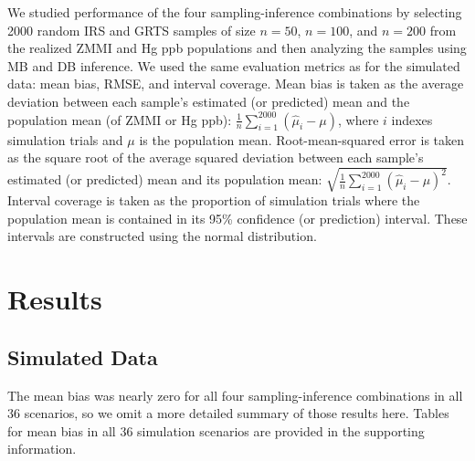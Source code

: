 \documentclass[]{elsarticle} %
\begin{document}
We studied performance of the four sampling-inference combinations by
selecting 2000 random IRS and GRTS samples of size \(n = 50\),
\(n = 100\), and \(n = 200\) from the realized ZMMI and Hg ppb
populations and then analyzing the samples using MB and DB inference. We
used the same evaluation metrics as for the simulated data: mean bias,
RMSE, and interval coverage. Mean bias is taken as the average deviation
between each sample's estimated (or predicted) mean and the population
mean (of ZMMI or Hg ppb):
\(\frac{1}{n}\sum_{i = 1}^{2000} (\hat{\mu}_i - \mu)\), where \(i\)
indexes simulation trials and \(\mu\) is the population mean.
Root-mean-squared error is taken as the square root of the average
squared deviation between each sample's estimated (or predicted) mean
and its population mean:
\(\sqrt{\frac{1}{n}\sum_{i = 1}^{2000} (\hat{\mu}_i - \mu)^2}\).
Interval coverage is taken as the proportion of simulation trials where
the population mean is contained in its 95\% confidence (or prediction)
interval. These intervals are constructed using the normal distribution.

\hypertarget{sec:results}{%
\section{Results}\label{sec:results}}

\hypertarget{sec:r_sim}{%
\subsection{Simulated Data}\label{sec:r_sim}}

The mean bias was nearly zero for all four sampling-inference
combinations in all 36 scenarios, so we omit a more detailed summary of
those results here. Tables for mean bias in all 36 simulation scenarios
are provided in the supporting information.
\end{document}
